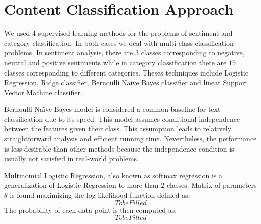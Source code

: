 \section{Content Classification Approach}
\label{sec:approach}
We used $4$ supervised learning methods for the problems of sentiment and category classification.
In both cases we deal with multi-class classification problems. In sentiment analysis, there are $3$ classes corresponding to negative, neutral and positive sentiments while in category classification there are $15$ classes corresponding to different categories.
Theses techniques include Logistic Regression, Ridge classifier, Bernoulli Naive Bayes classifier and linear Support Vector Machine classifier.

Bernoulli Naïve Bayes model is considered a common baseline for text classification due to its speed. 
This model assumes conditional independence between the features given their class. This assumption leads to relatively straightforward analysis and efficient running time. Nevertheless, the performance is less desirable than other methods because the independence condition is usually not satisfied in real-world problems.

%
%

Multinomial Logistic Regression, also known as softmax regression is a generalization of Logistic Regression to more than $2$ classes.
Matrix of parameters $\theta$ is found maximizing the log-likelihood function defined as:
\begin{equation}
 To be Filled
\label{eq:softmax-likelihood}
\end{equation}
The probability of each data point is then computed as:
\begin{equation}
 To be Filled
\label{eq:softmax-prob}
\end{equation}

